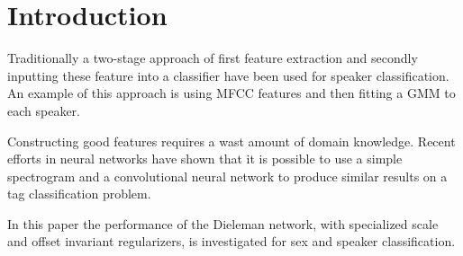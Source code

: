 \section{Introduction}

Traditionally a two-stage approach of first feature extraction and secondly inputting these feature into a classifier have been used for speaker classification. An example of this approach is using MFCC features and then fitting a GMM to each speaker.

Constructing good features requires a wast amount of domain knowledge. Recent efforts in neural networks\cite{dieleman} have shown that it is possible to use a simple spectrogram and a convolutional neural network to produce similar results on a tag classification problem.

In this paper the performance of the Dieleman network\cite{dieleman}, with specialized scale and offset invariant regularizers, is investigated for sex and speaker classification.
